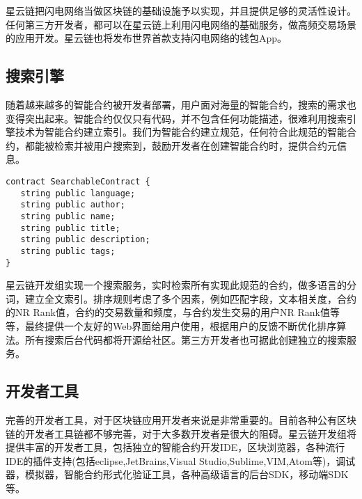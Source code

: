星云链把闪电网络当做区块链的基础设施予以实现，并且提供足够的灵活性设计。任何第三方开发者，都可以在星云链上利用闪电网络的基础服务，做高频交易场景的应用开发。星云链也将发布世界首款支持闪电网络的钱包App。


\subsection{搜索引擎}
随着越来越多的智能合约被开发者部署，用户面对海量的智能合约，搜索的需求也变得突出起来。智能合约仅仅只有代码，并不包含任何功能描述，很难利用搜索引擎技术为智能合约建立索引。我们为智能合约建立规范，任何符合此规范的智能合约，都能被检索并被用户搜索到，鼓励开发者在创建智能合约时，提供合约元信息。

\begin{lstlisting}[frame=single]
contract SearchableContract {
   string public language;
   string public author;
   string public name;
   string public title;
   string public description;
   string public tags;
}
\end{lstlisting}

星云链开发组实现一个搜索服务，实时检索所有实现此规范的合约，做多语言的分词，建立全文索引。排序规则考虑了多个因素，例如匹配字段，文本相关度，合约的NR Rank值，合约的交易数量和频度，与合约发生交易的用户NR Rank值等等，最终提供一个友好的Web界面给用户使用，根据用户的反馈不断优化排序算法。所有搜索后台代码都将开源给社区。第三方开发者也可据此创建独立的搜索服务。

\subsection{开发者工具}
完善的开发者工具，对于区块链应用开发者来说是非常重要的。目前各种公有区块链的开发者工具链都不够完善，对于大多数开发者是很大的阻碍。星云链开发组将提供丰富的开发者工具，包括独立的智能合约开发IDE，区块浏览器，各种流行IDE的插件支持(包括eclipse,JetBrains,Visual Studio,Sublime,VIM,Atom等)，调试器，模拟器，智能合约形式化验证工具，各种高级语言的后台SDK，移动端SDK等。
